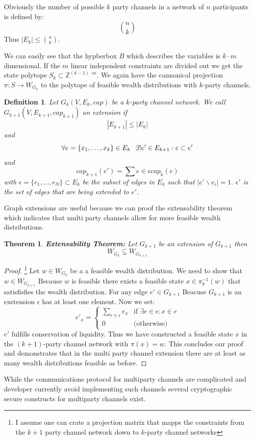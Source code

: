 \documentclass[10pt,twocolumn]{article}
\newtheorem{definition}{Definition}[section]
\newtheorem{theorem}{Theorem}[section]
\begin{document}
Obviously the number of possible $k$ party channels in a network of $n$ participants is defined by:
$${{n}\choose {k}}$$
Thus $|E_k|\leq {{n}\choose {k}}$.

We can easily see that the hypberbox $B$ which describes the variables is $k\cdot m$ dimensional.
If the $m$ linear independent constraints are divided out we get the state polytope $S_k\subset \mathbb{Z}^{(k-1)\cdot m}$.
We again have the cannonical projection $\pi: S\longrightarrow W_{G_k}$ to the polytope of feasible wealth distributions with $k$-party channels.

\begin{definition}
  Let $G_k(V,E_k,cap)$ be a $k$-party channel network.
  We call $G_{k+1}(V,E_{k+1},cap_{k+1})$ an extension if
  $$|E_{k+1}| \leq |E_k|$$
  and
  $$\forall e=\{x_1,\dots,x_k\}\in E_k \hspace{0.25cm}\exists! e'\in E_{k+1} : e\subset e'$$
  and
  $$cap_{k+1}(e') =\sum{e\in\epsilon} cap_k(e)$$
  with $\epsilon=\{e_1,\dots,e_N\}\subset E_k$ be the subset of edges in $E_k$  such that $|e'\backslash e_i|=1$.
  $\epsilon'$ is the set of edges that are being extended to $e'$.
\end{definition}

Graph extensions are useful because we can proof the extensability theorem which indicates that multi party channels allow for more feasible wealth distributions.


\begin{theorem}
  \textbf{Extensability Theorem:} 
  Let $G_{k+1}$ be an extension of $G_{k+1}$ then 
  $$W_{G_k} \subsetneq W_{G_{k+1}}$$
\end{theorem}

\begin{proof}\footnote{I assume one can crate a projection matrix that mapps the constraints from the $k+1$ party channel network down to $k$-party channel networks}
  Let $w\in W_{G_k}$ be a a feasible wealth distribution.
  We need to show that $w\in W_{G_{k+1}}$
  Because $w$ is feasible there exists a feasible state $x\in\pi_k^{-1}(w)$ that satisfisfies the wealth distribution.
  For any edge $e' \in G_{k+1}$
  Beacuse $G_{k+1}$ is an exstension $\epsilon$ has at least one element.
  Now we set:
\begin{equation}
  e'_x = \begin{cases}
      \sum_{e\in\epsilon}e_x & \text{if $\exists e\in\epsilon : x\in e$}\\
      0 & \text{(otherwise)}
    \end{cases}
\end{equation}
$e'$ fulfills conservation of liquidity.
Thus we have constructed a feasible state $x$ in the $(k+1)$-party channel network with $\pi(x)=w$.
This concludes our proof and demonstrates that in the multi party channel extension there are at least as many wealth distributions feasible as before.
\end{proof}
While the communications protocol for multiparty channels are complicated and developer currently avoid implementing such channels several cryptographic secure constructs for multiparty channels exist.
\end{document}
